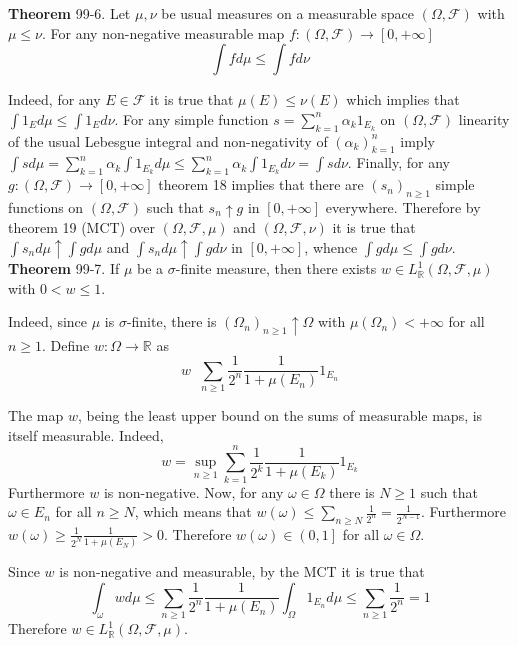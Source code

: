 \documentclass[a4paper]{article}
\newcommand{\clo}[1]{\left [ #1 \right ]}
\newcommand{\ploc}[1]{\left ( #1 \right ]}
\newcommand{\brac}[1]{\left ( #1 \right )}
\newcommand{\Real}{\mathbb{R}}
\newcommand{\Zinf}{\clo{ 0, +\infty }}
\newcommand{\Fcal}{\mathcal{F}}
\newcommand{\defn}{\mathop{\overset{\Delta}{=}}\nolimits}
\begin{document}
\label{thm:int_meas_ineq} \noindent \textbf{Theorem} 99-6.
Let $\mu, \nu$ be usual measures on a measurable space $\brac{\Omega, \Fcal}$ with $\mu\leq \nu$. For any non-negative measurable map $f:\brac{\Omega, \Fcal}\to\Zinf$ \[\int f d\mu \leq \int f d\nu\]

Indeed, for any $E\in \Fcal$ it is true that $\mu\brac{E}\leq \nu\brac{E}$ which implies that $\int 1_E d\mu \leq \int 1_E d\nu$. For any simple function $s=\sum_{k=1}^n \alpha_k 1_{E_k}$ on $\brac{\Omega, \Fcal}$ linearity of the usual Lebesgue integral and non-negativity of $\brac{\alpha_k}_{k=1}^n$ imply $\int s d\mu = \sum_{k=1}^n \alpha_k \int 1_{E_k} d\mu \leq \sum_{k=1}^n \alpha_k \int 1_{E_k} d\nu = \int s d\nu$. Finally, for any $g:\brac{\Omega, \Fcal}\to \Zinf$ theorem 18 implies that there are $\brac{s_n}_{n\geq 1}$ simple functions on $\brac{\Omega, \Fcal}$ such that $s_n\uparrow g$ in $\Zinf$ everywhere. Therefore by theorem 19 (MCT) over $\brac{\Omega, \Fcal,\mu}$ and $\brac{\Omega, \Fcal,\nu}$ it is true that $\int s_n d\mu\uparrow\int g d\mu$ and $\int s_n d\mu\uparrow\int g d\nu$ in $\Zinf$, whence $\int g d\mu \leq \int g d\nu$.\\

\label{thm:l_real_weighting_func} \noindent \textbf{Theorem} 99-7.
If $\mu$ be a $\sigma$-finite measure, then there exists $w\in L^1_\Real\brac{\Omega, \Fcal, \mu}$ with $0<w\leq 1$.

Indeed, since $\mu$ is $\sigma$-finite, there is $\brac{\Omega_n}_{n\geq 1}\uparrow \Omega$ with $\mu\brac{\Omega_n}<+\infty$ for all $n\geq 1$. Define $w:\Omega\to \Real$ as \[w \defn \sum_{n\geq1} \frac{1}{2^n} \frac{1}{1+\mu\brac{E_n}} 1_{E_n}\] 

The map $w$, being the least upper bound on the sums of measurable maps, is itself measurable. Indeed, \[w = \sup_{n\geq1} \sum_{k=1}^n \frac{1}{2^k}\frac{1}{1+\mu\brac{E_k}} 1_{E_k}\] Furthermore $w$ is non-negative. Now, for any $\omega\in \Omega$ there is $N\geq1$ such that $\omega\in E_n$ for all $n\geq N$, which means that $w\brac{\omega} \leq \sum_{n\geq N} \frac{1}{2^n} = \frac{1}{2^{N-1}}$. Furthermore $w\brac{\omega}\geq \frac{1}{2^N}\frac{1}{1+\mu\brac{E_N}}>0$. Therefore $w\brac{\omega}\in \ploc{0, 1}$ for all $\omega\in \Omega$.

Since $w$ is non-negative and measurable, by the MCT it is true that \[\int_\omega w d\mu \leq \sum_{n\geq1} \frac{1}{2^n}\frac{1}{1+\mu\brac{E_n}} \int_\Omega 1_{E_n} d\mu \leq \sum_{n\geq1} \frac{1}{2^n} = 1\] Therefore $w\in L^1_\Real\brac{\Omega, \Fcal, \mu}$.\\
\end{document}
